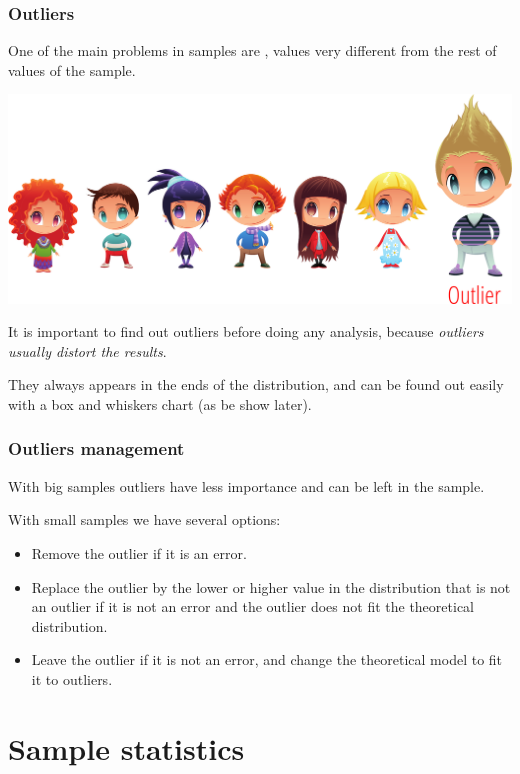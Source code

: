 \begin{frame}
\frametitle{Outliers}
One of the main problems in samples are , values very different from the rest of values of the sample.
\begin{center}
\includegraphics[scale=0.5]{img/descriptive/outlier.png}
\end{center}

It is important to find out outliers before doing any analysis, because \alert{\emph{outliers usually distort the results}}.

They always appears in the ends of the distribution, and can be found out easily with a box and whiskers chart (as be show later).
\end{frame}


\begin{frame}
\frametitle{Outliers management}
With big samples outliers have less importance and can be left in the sample.

With small samples we have several options:

\begin{itemize}
\item Remove the outlier if it is an error. 
\item Replace the outlier by the lower or higher value in the distribution that is not an outlier if it is not an error and the outlier does not fit the theoretical distribution. 
\item Leave the outlier if it is not an error, and change the theoretical model to fit it to outliers.  
\end{itemize}
\end{frame}
 


\section{Sample statistics}

